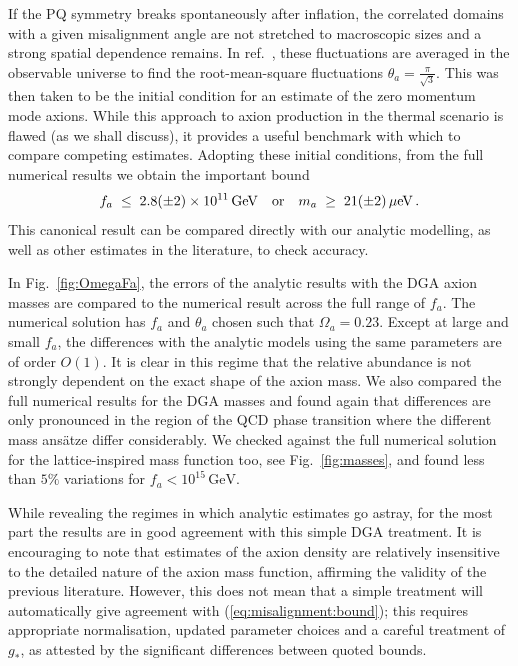 \documentclass[preprint,nofootinbib]{revtex4}
\newcommand{\reffig}[1]{Fig.~\ref{#1}}
\newcommand{\units}[1]{\, \mathrm{#1}}
\begin{document}
If the PQ symmetry breaks spontaneously after inflation, the correlated domains with a given misalignment angle are not  stretched to macroscopic sizes and a strong spatial dependence remains. In ref.~\cite{turner:axion:cosmology}, these fluctuations are averaged in the observable universe to find the root-mean-square fluctuations $\theta_a=\frac{\pi}{\sqrt{3}}$. This was then taken to be the initial condition for an estimate of the zero momentum mode axions. While this approach to axion production in the thermal scenario is flawed (as we shall discuss), it provides a useful benchmark with which to compare competing estimates. Adopting these initial conditions, from the full numerical results we obtain the important bound
\begin{equation}
 f_a\;\le\;2.8(\pm2)\times10^{11}\units{GeV} \quad \hbox{or} \quad  m_a\;\ge\;21(\pm2) \units{\mu eV} \,.\label{eq:misalignment:bound}
\end{equation}
This canonical result can be compared directly with our analytic modelling, as well as other estimates in the literature, to check accuracy.

In \reffig{fig:OmegaFa}, the errors of the analytic results with the DGA axion masses are compared to the numerical result across the full range of $f_a$. The numerical solution has $f_a$ and $\theta _a$ chosen such that $\Omega_a= 0.23$. Except at large and small $f_a$, the differences with the analytic models using the same parameters are of order $O(1)$.  It is clear in this regime that the relative abundance is not strongly dependent on the exact shape of the axion mass. We also compared the full numerical results for the DGA masses and found again that differences are only pronounced in the region of the QCD phase transition where the different mass ans\"atze differ considerably. We checked against the full numerical solution for the lattice-inspired mass function too, see \reffig{fig:masses}, and found less than $5\%$ variations for  $f_a< 10^{15} \units{GeV}$. 

While revealing the regimes in which analytic estimates go astray, for the most part the results are in 
good agreement with this simple DGA treatment. It is encouraging to note that estimates of the axion density are 
relatively insensitive to the detailed nature of the axion mass function, affirming the validity of the previous
literature. However, this does not mean that a simple treatment will automatically give agreement with 
(\ref{eq:misalignment:bound}); this requires appropriate normalisation, updated parameter choices and a careful 
treatment of $g_*$, as attested by the significant differences between quoted bounds.
\end{document}
